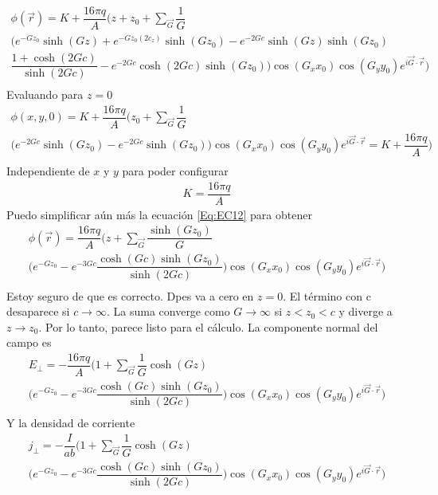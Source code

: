 \documentclass[a4paper,11pt,]{book}
\begin{document}
\begin{eqnarray}\label{Eq:EC13}
\nonumber\phi(\vec{r}) = K+\dfrac{16\pi q}{A} \bigg(z+z_0  + \displaystyle\sum_{\vec{G}}\dfrac{1}{G}  \\ \nonumber\bigg(e^{-Gz_0} \sinh(Gz)+e^{-Gz_0(2c_z)} \sinh(Gz_0) -e^{-2Gc} \sinh(Gz) \sinh(Gz_0) \\ \nonumber \dfrac{1+\cosh(2Gc)}{\sinh(2Gc)} - e^{-2Gc}\cosh(2Gc) \sinh(Gz_0)   \bigg) \cos(G_x x_0) \cos(G_y y_0) e^{i \vec{G} \cdot \vec{r}}   \bigg)\\
\end{eqnarray}
Evaluando para $ z = 0 $
{\small
\begin{eqnarray}
\nonumber\phi(x, y, 0) = K+\dfrac{16\pi q}{A} \bigg(z_0  + \displaystyle\sum_{\vec{G}}\dfrac{1}{G}  \\ \nonumber\bigg(e^{-2Gc} \sinh(Gz_0)-e^{-2Gc} \sinh(Gz_0)   \bigg) \cos(G_x x_0) \cos(G_y y_0) e^{i \vec{G} \cdot \vec{r}} = K+\dfrac{16\pi q}{A} \bigg)\\
\end{eqnarray} }
Independiente de $ x $ y $ y $ para poder configurar
\begin{eqnarray}
K=\dfrac{16\pi q}{A} 
\end{eqnarray}
Puedo simplificar aún más la ecuación \ref{Eq:EC12} para obtener
\begin{eqnarray}
\nonumber\phi(\vec{r}) = \dfrac{16\pi q}{A}\bigg( z  + \displaystyle\sum_{\vec{G}}\dfrac{\sinh(Gz_0)}{G}  \\ \nonumber\bigg(e^{-Gz_0} -e^{-3Gc} \dfrac{\cosh(Gc)\sinh(Gz_0)}{\sinh(2Gc)}   \bigg) \cos(G_x x_0) \cos(G_y y_0) e^{i \vec{G} \cdot \vec{r}}  \bigg)\\
\end{eqnarray}
Estoy seguro de que es correcto. Dpes va a cero en $ z = 0 $. El término con c desaparece si $ c \longrightarrow \infty $. La suma converge como $ G\longrightarrow \infty $ si $ z< z_0 < c $ y diverge a $ z \longrightarrow z_0 $. Por lo tanto, parece listo para el cálculo.
La componente normal del campo es
\begin{eqnarray}
\nonumber E_\perp = -\dfrac{16\pi q}{A}\bigg( 1  + \displaystyle\sum_{\vec{G}}\dfrac{1}{G} \cosh(Gz) \\ \nonumber\bigg(e^{-Gz_0} -e^{-3Gc} \dfrac{\cosh(Gc)\sinh(Gz_0)}{\sinh(2Gc)}   \bigg) \cos(G_x x_0) \cos(G_y y_0) e^{i \vec{G} \cdot \vec{r}}  \bigg)\\
\end{eqnarray}
Y la densidad de corriente 
\begin{eqnarray}\label{Eq:J}
\nonumber j_\perp = -\dfrac{I}{ab}\bigg( 1  + \displaystyle\sum_{\vec{G}}\dfrac{1}{G} \cosh(Gz) \\ \nonumber\bigg(e^{-Gz_0} -e^{-3Gc} \dfrac{\cosh(Gc)\sinh(Gz_0)}{\sinh(2Gc)}   \bigg) \cos(G_x x_0) \cos(G_y y_0) e^{i \vec{G} \cdot \vec{r}}  \bigg)\\
\end{eqnarray}
\end{document}

